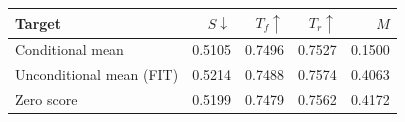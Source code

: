 \begingroup\small\setlength{\tabcolsep}{4pt}
\begin{tabular}{@{}lrrrr@{}}
\toprule
Target & $S\downarrow$ & $T_f\uparrow$ & $T_r\uparrow$ & $M$ \\
\midrule
Conditional mean & 0.5105 & 0.7496 & 0.7527 & 0.1500 \\
Unconditional mean (FIT) & 0.5214 & 0.7488 & 0.7574 & 0.4063 \\
Zero score & 0.5199 & 0.7479 & 0.7562 & 0.4172 \\
\bottomrule
\end{tabular}\endgroup

